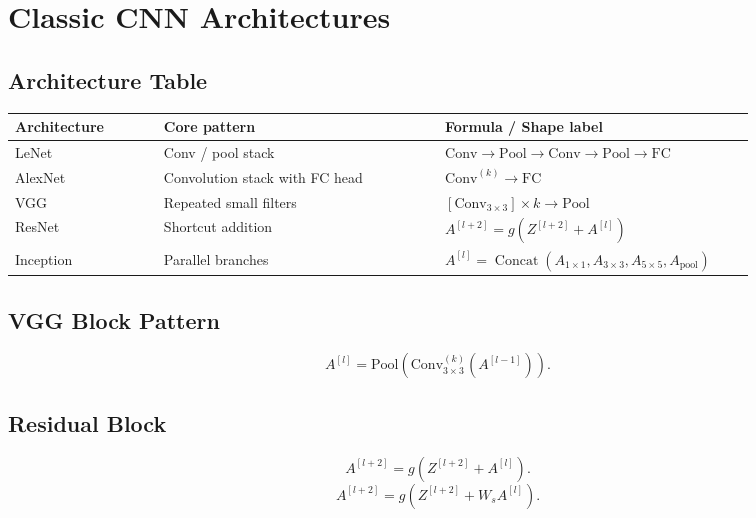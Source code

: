 \section{Classic CNN Architectures}

\subsection{Architecture Table}

\begin{center}
\begin{tabular}{>{\raggedright\arraybackslash}p{0.18\linewidth}
                >{\raggedright\arraybackslash}p{0.34\linewidth}
                >{\raggedright\arraybackslash}p{0.34\linewidth}}
\toprule
Architecture & Core pattern & Formula / Shape label \\
\midrule
LeNet &
Conv / pool stack &
$\mathrm{Conv} \to \mathrm{Pool} \to \mathrm{Conv} \to \mathrm{Pool} \to \mathrm{FC}$ \\
\addlinespace
AlexNet &
Convolution stack with FC head &
$\mathrm{Conv}^{(k)} \to \mathrm{FC}$ \\
\addlinespace
VGG &
Repeated small filters &
$[\mathrm{Conv}_{3\times3}] \times k \to \mathrm{Pool}$ \\
\addlinespace
ResNet &
Shortcut addition &
$A^{[l+2]} = g(Z^{[l+2]} + A^{[l]})$ \\
\addlinespace
Inception &
Parallel branches &
$A^{[l]}=\operatorname{Concat}(A_{1\times1},A_{3\times3},A_{5\times5},A_{\mathrm{pool}})$ \\
\bottomrule
\end{tabular}
\end{center}

\subsection{VGG Block Pattern}

\[
A^{[l]}
=
\mathrm{Pool}
\left(
\mathrm{Conv}_{3\times3}^{(k)}
(A^{[l-1]})
\right).
\]

\subsection{Residual Block}

\[
A^{[l+2]}
=
g
\left(
Z^{[l+2]} + A^{[l]}
\right).
\]
\[
A^{[l+2]}
=
g
\left(
Z^{[l+2]} + W_s A^{[l]}
\right).
\]

